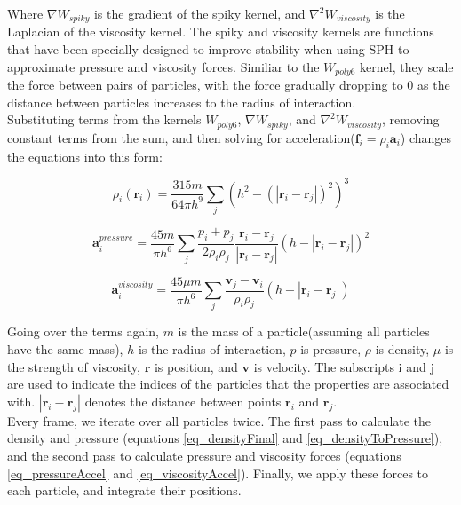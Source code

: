 \documentclass[]{article}
\begin{document}
	Where \( \nabla W_{spiky} \) is the gradient of the spiky kernel, and \( \nabla ^ 2 W_{viscosity} \) is the 
	Laplacian of the viscosity kernel. The spiky and viscosity kernels are functions that have been specially designed
	to improve stability when using SPH to approximate pressure and viscosity forces. Similiar to the \(W_{poly6}\) kernel,
	they scale the force between pairs of particles, with the force gradually dropping to 0 as the distance between particles
	increases to the radius of interaction.\\
	
	Substituting terms from the kernels \(W_{poly6}\), \(\nabla W_{spiky}\), and \(  \nabla ^ 2 W_{viscosity}\), 
	removing constant terms from the sum, and then solving for acceleration(\( \mathbf{f}_i = \rho_i \mathbf{a}_i \)) 
	changes the equations into this form:
	
	\begin{equation}
		\label{eq_densityFinal}
		\rho_i (\mathbf{r}_i) = \frac{315m}{64 \pi h^9 } \sum_{j}^{} (h^2 - (|\mathbf{r}_i - \mathbf{r}_j|)^2 )^3
	\end{equation}
	
	\begin{equation}
		\label{eq_pressureAccel}
		\mathbf{a}_{i}^{pressure} =  \frac{45 m}{\pi h^6}  \sum_{j}^{} \frac{p_i + p_j}{2 \rho_i \rho_j} 
		 \frac{\mathbf{r}_i - \mathbf{r}_j}{|\mathbf{r}_i - \mathbf{r}_j|} (h - |\mathbf{r}_i - \mathbf{r}_j|)^2 
	\end{equation}
	
	\begin{equation}
		\label{eq_viscosityAccel}
		\mathbf{a}_{i}^{viscosity} = \frac{45 \mu m}{\pi h^6} \sum_{j}^{} \frac{ \mathbf{v}_j - \mathbf{v}_i}{ \rho_i \rho_j} (h - |\mathbf{r}_i - \mathbf{r}_j|)
	\end{equation}
	
	Going over the terms again, \(m\) is the mass of a particle(assuming all particles have the same mass), \(h\) is the 
	radius of interaction, \(p\) is pressure, \(\rho\) is density, \(\mu\) is the strength of viscosity, \(\mathbf{r}\) 
	is position, and \(\mathbf{v}\) is velocity. The subscripts i and j are used to indicate the indices of the particles
	that the properties are associated with. \(|\mathbf{r}_i - \mathbf{r}_j|\) denotes the distance between points 
	\(\mathbf{r}_i\) and \(\mathbf{r}_j\). \\
	
	Every frame, we iterate over all particles twice. The first pass to calculate the density and pressure (equations 
	\ref{eq_densityFinal} and \ref{eq_densityToPressure}), and the second pass to calculate pressure and viscosity forces
	(equations \ref{eq_pressureAccel} and \ref{eq_viscosityAccel}). Finally, we apply these forces to each particle, 
	and integrate their positions.\\
	
\end{document}
